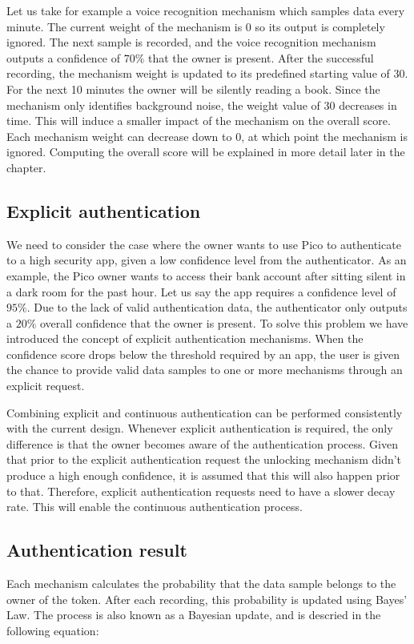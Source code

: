Let us take for example a voice recognition mechanism which samples data every minute. The current weight of the mechanism is 0 so its output is completely ignored. The next sample is recorded, and the voice recognition mechanism outputs a confidence of $70\%$ that the owner is present. After the successful recording, the mechanism weight is updated to its predefined starting value of 30. For the next 10 minutes the owner will be silently reading a book. Since the mechanism only identifies background noise, the weight value of 30 decreases in time. This will induce a smaller impact of the mechanism on the overall score. Each mechanism weight can decrease down to 0, at which point the mechanism is ignored. Computing the overall score will be explained in more detail later in the chapter.

\subsection*{Explicit authentication}
We need to consider the case where the owner wants to use Pico to authenticate to a high security app, given a low confidence level from the authenticator. As an example, the Pico owner wants to access their bank account after sitting silent in a dark room for the past hour. Let us say the app requires a confidence level of $95\%$. Due to the lack of valid authentication data, the authenticator only outputs a $20\%$ overall confidence that the owner is present. To solve this problem we have introduced the concept of explicit authentication mechanisms. When the confidence score drops below the threshold required by an app, the user is given the chance to provide valid data samples to one or more mechanisms through an explicit request.

Combining explicit and continuous authentication can be performed consistently with the current design. Whenever explicit authentication is required, the only difference is that the owner becomes aware of the authentication process. Given that prior to the explicit authentication request the unlocking mechanism didn't produce a high enough confidence, it is assumed that this will also happen prior to that. Therefore, explicit authentication requests need to have a slower decay rate. This will enable the continuous authentication process.

\subsection*{Authentication result}
\label{authfeedback}
Each mechanism calculates the probability that the data sample belongs to the owner of the token. After each recording, this probability is updated using Bayes' Law. The process is also known as a Bayesian update, and is descried in the following equation:

